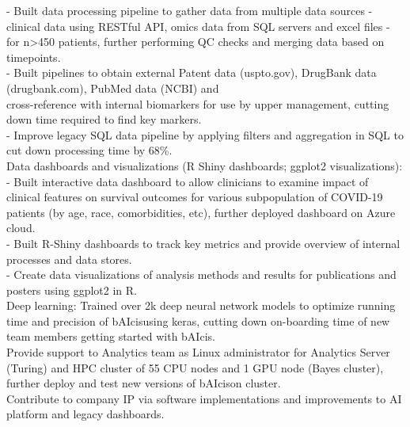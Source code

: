 \documentclass[a4paper]{article}
\newcommand{\mybullet}{
	\indent 
  \textbullet \hspace*{2mm}
}
\newcommand{\mysubbullet}{
	\indent 
  - \hspace*{2mm}
}
\begin{document}
  \mysubbullet Built data processing pipeline to gather data from multiple data sources - clinical data using RESTful API, omics data from \hspace*{10mm}SQL servers and excel files - for n>450 patients, further performing QC checks and merging data based on timepoints. \\
  \mysubbullet Built pipelines to obtain external Patent data (uspto.gov), DrugBank data (drugbank.com), PubMed data (NCBI) and \\\hspace*{10mm}cross-reference with internal biomarkers for use by upper management, cutting down time required to find key markers. \\
  \mysubbullet Improve legacy SQL data pipeline by applying filters and aggregation in SQL to cut down processing time by 68\%. \\
  \mybullet Data dashboards and visualizations (R Shiny dashboards; ggplot2 visualizations):  \\ 
  \mysubbullet Built interactive data dashboard to allow clinicians to examine impact of clinical features on survival outcomes for various \hspace*{10mm}subpopulation of COVID-19 patients (by age, race, comorbidities, etc), further deployed dashboard on Azure cloud. \\
  \mysubbullet Built R-Shiny dashboards to track key metrics and provide overview of internal processes and data stores. \\
  \mysubbullet Create data visualizations of analysis methods and results for publications and posters using ggplot2 in R. \\
  \mybullet Deep learning: Trained over 2k deep neural network models to optimize running time and precision of bAIcis\textregistered using keras, \hspace*{10mm}cutting down on-boarding time of new team members getting started with bAIcis\textregistered. \\
  \mybullet Provide support to Analytics team as Linux administrator for Analytics Server (Turing) and HPC cluster of 55 CPU nodes \hspace*{10mm}and 1 GPU node (Bayes cluster), further deploy and test new versions of bAIcis\textregistered on cluster. \\
  \mybullet Contribute to company IP via software implementations and improvements to AI platform and legacy dashboards. \\
\end{document}
